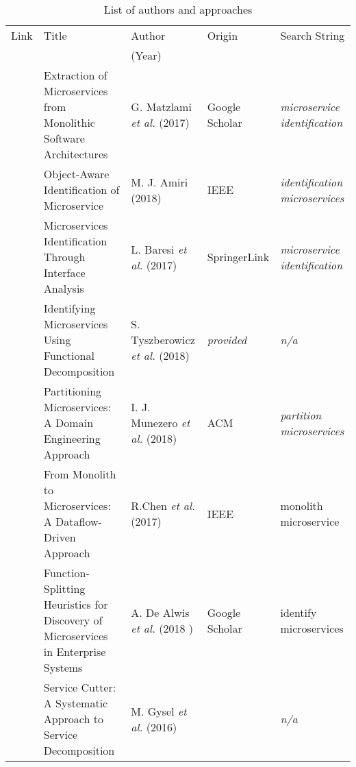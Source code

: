 \begin{raggedright}

\begin{table}[h!]


     
	
	\begin{tabularx}{\textwidth}{lXXlX}
		\rowcolor{gray!50}
		Link & Title & Author   & Origin & Search String  \\
		
		\rowcolor{gray!50}
		& & (Year) & & \\
		
		\cite{ExtractionMazlami} & Extraction of Microservices from Monolithic Software Architectures  & G. Matzlami \textit{et al.} (2017) & Google Scholar&  {\itshape microservice identification }  \\
		
		
		\cite{ObjectAwareAmiri} & Object-Aware Identification of Microservice & M. J. Amiri (2018) & IEEE & \textit{identification microservices}\\\
		
		\cite{interfaceAnalysisBaresi} & Microservices Identification Through Interface Analysis & L. Baresi \textit{et al.} (2017)& SpringerLink & \textit{microservice identification}\\
		
		
		
		 
		 \cite{FunctionalDecompositionHeinrich}& Identifying Microservices Using Functional Decomposition & S. Tyszberowicz \textit{et al.} (2018) & \textit{provided} & \textit{n/a} \\
		 
		 \cite{DomainEngineeringMunezero} & Partitioning Microservices: A Domain Engineering Approach & I. J. Munezero \textit{et al.} (2018) & ACM & \textit{partition microservices}\\
		 
		 
		 \cite{DataflowDrivenChen} & From Monolith to Microservices: A Dataflow-Driven Approach & R.Chen \textit{et al.} (2017)& IEEE & monolith microservice \\
		 
		\cite{HeuristicsAlwis} & Function-Splitting Heuristics for Discovery of Microservices in Enterprise Systems & A. De Alwis \textit{et al.} (2018 )& Google Scholar & identify microservices \\
		
	\cite{ServiceCutter} & 	Service Cutter: A Systematic Approach to Service Decomposition& M. Gysel \textit{et al.} (2016) & \cite{interfaceAnalysisBaresi} & \textit{n/a} \\
	
	\end{tabularx}
	\caption{List of authors and approaches}
	\label{tab:overviewLiterature}
	

\end{table}
\end{raggedright}


